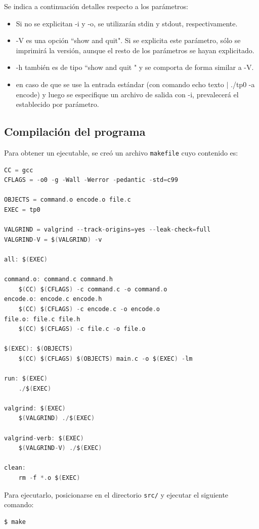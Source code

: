 \documentclass[11pt,a4paper]{article}
\begin{document}
Se indica a continuación detalles respecto a los parámetros:

\begin{itemize}
    \item Si no se explicitan -i y -o, se utilizarán stdin y stdout, respectivamente. 
    \item -V es una opción ``show and quit". Si se explicita este parámetro, sólo se imprimirá la versión, aunque el resto de los parámetros se hayan explicitado. 
    \item -h también es de tipo ``show and quit " y se comporta de forma similar a -V.
    \item en caso de que se use la entrada estándar (con comando echo texto $|$ ./tp0 -a encode) y luego se especifique un archivo de salida con -i, prevalecerá el establecido por parámetro.
\end{itemize}

\subsection{Compilación del programa}

Para obtener un ejecutable, se creó un archivo \texttt{makefile} cuyo contenido es:
	\begin{lstlisting}[language=C]
CC = gcc
CFLAGS = -o0 -g -Wall -Werror -pedantic -std=c99

OBJECTS = command.o encode.o file.c
EXEC = tp0

VALGRIND = valgrind --track-origins=yes --leak-check=full
VALGRIND-V = $(VALGRIND) -v

all: $(EXEC)

command.o: command.c command.h
	$(CC) $(CFLAGS) -c command.c -o command.o
encode.o: encode.c encode.h
	$(CC) $(CFLAGS) -c encode.c -o encode.o
file.o: file.c file.h
	$(CC) $(CFLAGS) -c file.c -o file.o

$(EXEC): $(OBJECTS)
	$(CC) $(CFLAGS) $(OBJECTS) main.c -o $(EXEC) -lm

run: $(EXEC)
	./$(EXEC)

valgrind: $(EXEC)
	$(VALGRIND) ./$(EXEC)

valgrind-verb: $(EXEC)
	$(VALGRIND-V) ./$(EXEC)

clean:
	rm -f *.o $(EXEC)
	\end{lstlisting}


Para ejecutarlo, posicionarse en el directorio \texttt{src/} y ejecutar el siguiente comando:
\begin{lstlisting}
$ make
\end{lstlisting}
\end{document}
